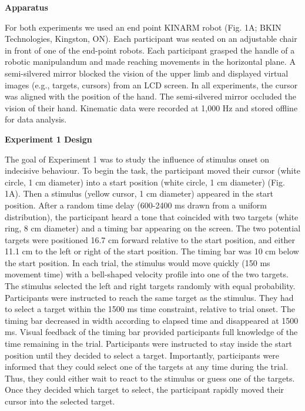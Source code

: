 \documentclass[12pt,letterpaper]{article}
\begin{document}
\noindent\textbf{Apparatus}

For both experiments we used an end point KINARM robot (Fig. 1A; BKIN Technologies, Kingston, ON). Each participant was seated on an adjustable chair in front of one of the end-point robots. Each participant grasped the handle of a robotic manipulandum and made reaching movements in the horizontal plane. A semi-silvered mirror blocked the vision of the upper limb and displayed virtual images (e.g., targets, cursors) from an LCD screen. In all experiments, the cursor was aligned with the position of the hand. The semi-silvered mirror occluded the vision of their hand. Kinematic data were recorded at 1,000 Hz and stored offline for data analysis.

\noindent\textbf{\large\textcolor{mydarkblue}{Experiment 1 Design}}

The goal of Experiment 1 was to study the influence of stimulus onset on indecisive behaviour. To begin the task, the participant moved their cursor (white circle, 1 cm diameter) into a start position (white circle, 1 cm diameter) (Fig. 1A). Then a stimulus (yellow cursor, 1 cm diameter) appeared in the start position. After a random time delay (600-2400 ms drawn from a uniform distribution), the participant heard a tone that coincided with two targets (white ring, 8 cm diameter) and a timing bar appearing on the screen. The two potential targets were positioned 16.7 cm forward relative to the start position, and either 11.1 cm to the left or right of the start position. The timing bar was 10 cm below the start position. In each trial, the stimulus would move quickly (150 ms movement time) with a bell-shaped velocity profile into one of the two targets. The stimulus selected the left and right targets randomly with equal probability. Participants were instructed to reach the same target as the stimulus. They had to select a target within the 1500 ms time constraint, relative to trial onset. The timing bar decreased in width according to elapsed time and disappeared at 1500 ms. Visual feedback of the timing bar provided participants full knowledge of the time remaining in the trial. Participants were instructed to stay inside the start position until they decided to select a target.  Importantly, participants were informed that they could select one of the targets at any time during the trial. Thus, they could either wait to react to the stimulus or guess one of the targets. Once they decided which target to select, the participant rapidly moved their cursor into the selected target.
\end{document}
